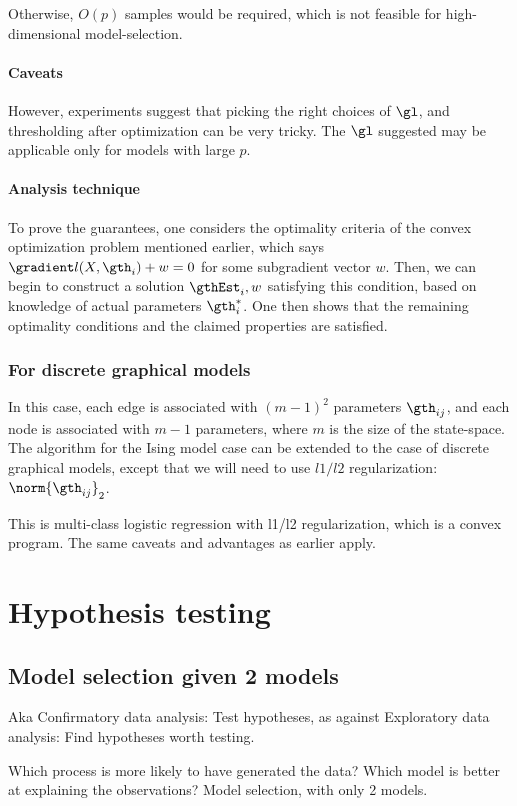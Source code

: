 \documentclass[oneside, article]{memoir}
\begin{document}
Otherwise, $O(p)$ samples would be required, which is not feasible for high-dimensional model-selection.

\subsubsection{Caveats}
However, experiments suggest that picking the right choices of $\gl$, and thresholding after optimization can be very tricky. The $\gl$ suggested may be applicable only for models with large $p$.

\subsubsection{Analysis technique}
To prove the guarantees, one considers the optimality criteria of the convex optimization problem mentioned earlier, which says $\gradient l(X, \gth_i) + w = 0$ for some subgradient vector $w$. Then, we can begin to construct a solution $\gthEst_i, w$ satisfying this condition, based on knowledge of actual parameters $\gth^*_i$. One then shows that the remaining optimality conditions  and the claimed properties are satisfied.

\subsection{For discrete graphical models}
In this case, each edge is associated with $(m-1)^{2}$ parameters $\gth_{ij}$, and each node is associated with $m-1$ parameters, where $m$ is the size of the state-space. The algorithm for the Ising model case can be extended to the case of discrete graphical models, except that we will need to use $l1/l2$ regularization: $\norm{\gth_{ij}}_{2}$.

This is multi-class logistic regression with l1/l2 regularization, which is a convex program. The same caveats and advantages as earlier apply.

\chapter{Hypothesis testing}
\section{Model selection given 2 models}
Aka Confirmatory data analysis: Test hypotheses, as against Exploratory data analysis: Find hypotheses worth testing.

Which process is more likely to have generated the data? Which model is better at explaining the observations? Model selection, with only 2 models.
\end{document}
